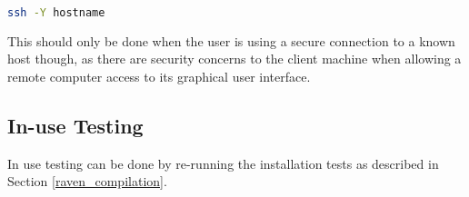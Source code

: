 \begin{lstlisting}[language=bash]
ssh -Y hostname
\end{lstlisting}

This should only be done when the user is using a secure connection to
a known host though, as there are security concerns to the client
machine when allowing a remote computer access to its graphical user
interface.


\subsection{In-use Testing}

In use testing can be done by re-running the installation tests as
described in Section \ref{raven_compilation}.
